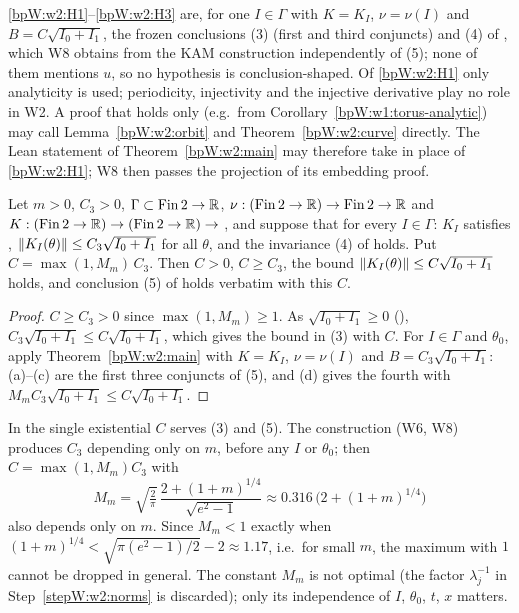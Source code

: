 \begin{remark}[Hypotheses]\label{bpW:w2:hyp}
\ref{bpW:w2:H1}--\ref{bpW:w2:H3} are, for one $I\in\Gamma$ with $K=K_I$, $\nu=\nu(I)$ and $B=C\sqrt{I_0+I_1}$, the frozen
conclusions (3) (first and third conjuncts) and (4) of , which W8 obtains from the KAM construction
independently of (5); none of them mentions $u$, so no hypothesis is conclusion-shaped. Of \ref{bpW:w2:H1} only
analyticity is used; periodicity, injectivity and the injective derivative play no role in W2. A proof that holds
only  (e.g.\ from Corollary~\ref{bpW:w1:torus-analytic}) may call
Lemma~\ref{bpW:w2:orbit} and Theorem~\ref{bpW:w2:curve} directly. The Lean statement of Theorem~\ref{bpW:w2:main} may
therefore take  in place of \ref{bpW:w2:H1}; W8 then passes the projection
 of its embedding proof.
\end{remark}

\begin{corollary}\label{bpW:w2:clause5}
Let $m>0$, $C_3>0$, $\Gamma\subset\mathrm{Fin}\,2\to\mathbb{R}$, $\nu:(\mathrm{Fin}\,2\to\mathbb{R})\to\mathrm{Fin}\,2\to\mathbb{R}$ and
$K:(\mathrm{Fin}\,2\to\mathbb{R})\to(\mathrm{Fin}\,2\to\mathbb{R})\to$ , and suppose that for every $I\in\Gamma$:
$K_I$ satisfies , $\lVert K_I(\theta)\rVert\le C_3\sqrt{I_0+I_1}$ for all $\theta$, and
the invariance (4) of  holds. Put $C=\max(1,M_m)\,C_3$. Then $C>0$, $C\ge C_3$, the bound
$\lVert K_I(\theta)\rVert\le C\sqrt{I_0+I_1}$ holds, and conclusion (5) of  holds verbatim with this $C$.
\end{corollary}

\begin{proof}
$C\ge C_3>0$ since $\max(1,M_m)\ge1$. As $\sqrt{I_0+I_1}\ge0$ (),
$C_3\sqrt{I_0+I_1}\le C\sqrt{I_0+I_1}$, which gives the bound in (3) with $C$. For $I\in\Gamma$ and $\theta_0$, apply
Theorem~\ref{bpW:w2:main} with $K=K_I$, $\nu=\nu(I)$ and $B=C_3\sqrt{I_0+I_1}$: (a)--(c) are the first three conjuncts
of (5), and (d) gives the fourth with $M_mC_3\sqrt{I_0+I_1}\le C\sqrt{I_0+I_1}$.
\end{proof}

\begin{remark}\label{bpW:w2:constants}
In  the single existential $C$ serves (3) and (5). The construction (W6, W8) produces $C_3$ depending only
on $m$, before any $I$ or $\theta_0$; then $C=\max(1,M_m)C_3$ with
\[M_m=\sqrt{\tfrac2\pi}\,\frac{2+(1+m)^{1/4}}{\sqrt{e^2-1}}\approx0.316\,\bigl(2+(1+m)^{1/4}\bigr)\]
also depends only on $m$. Since $M_m<1$ exactly when $(1+m)^{1/4}<\sqrt{\pi(e^2-1)/2}-2\approx1.17$, i.e.\ for small
$m$, the maximum with $1$ cannot be dropped in general. The constant $M_m$ is not optimal (the factor
$\lambda_j^{-1}$ in Step~\ref{stepW:w2:norms} is discarded); only its independence of $I$, $\theta_0$, $t$, $x$
matters.
\end{remark}

